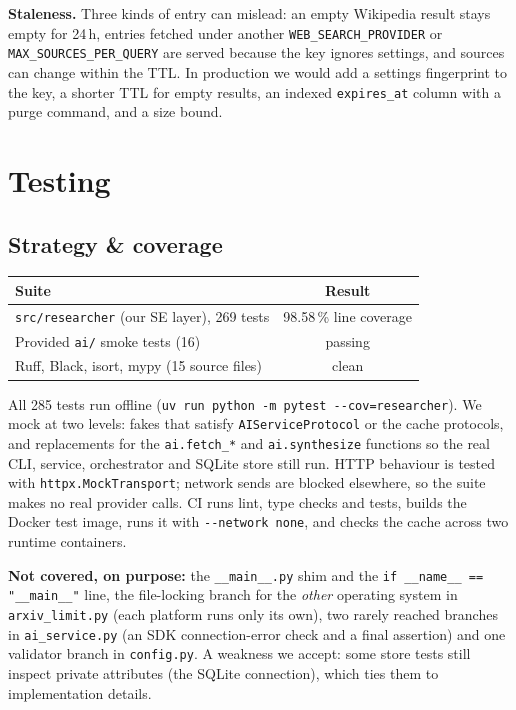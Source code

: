 \documentclass[11pt,a4paper]{article}
\newcommand{\owntests}{269}
\newcommand{\smoketests}{16}
\newcommand{\alltests}{285}
\newcommand{\coveragepct}{98.58}
\newcommand{\cmd}[1]{\texttt{#1}}
\begin{document}
\textbf{Staleness.} Three kinds of entry can mislead: an empty Wikipedia result
stays empty for 24\,h, entries fetched under another \cmd{WEB\_SEARCH\_PROVIDER} or
\cmd{MAX\_SOURCES\_PER\_QUERY} are served because the key ignores settings, and
sources can change within the TTL. In production we would add a settings
fingerprint to the key, a shorter TTL for empty results, an indexed
\cmd{expires\_at} column with a purge command, and a size bound.

\section{Testing}\label{sec:testing}

\subsection{Strategy \& coverage}

\begin{center}\small
\begin{tabular}{lc}
\toprule
\textbf{Suite} & \textbf{Result} \\
\midrule
\texttt{src/researcher} (our SE layer), \owntests{} tests & \coveragepct\,\% line coverage \\
Provided \texttt{ai/} smoke tests (\smoketests{}) & passing \\
Ruff, Black, isort, mypy (15 source files) & clean \\
\bottomrule
\end{tabular}
\end{center}

All \alltests{} tests run offline (\cmd{uv run python -m pytest -{}-cov=researcher}).
We mock at two levels: fakes that satisfy \cmd{AIServiceProtocol} or the cache
protocols, and replacements for the \cmd{ai.fetch\_*} and \cmd{ai.synthesize}
functions so the real CLI, service, orchestrator and SQLite store still run. HTTP
behaviour is tested with \cmd{httpx.MockTransport}; network sends are blocked
elsewhere, so the suite makes no real provider calls. CI runs lint, type checks
and tests, builds the Docker test image, runs it with \cmd{-{}-network none}, and
checks the cache across two runtime containers.

\textbf{Not covered, on purpose:} the \cmd{\_\_main\_\_.py} shim and the
\cmd{if \_\_name\_\_ == "\_\_main\_\_"} line, the file-locking branch for the
\emph{other} operating system in \cmd{arxiv\_limit.py} (each platform runs only
its own), two rarely reached branches in \cmd{ai\_service.py} (an SDK
connection-error check and a final assertion) and one validator branch in
\cmd{config.py}. A weakness we accept: some store tests still inspect private
attributes (the SQLite connection), which ties them to implementation details.
\end{document}
